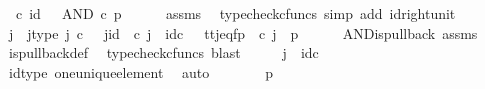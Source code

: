 \begin{isabellebody}
\ {\isachardoublequoteopen}{\isasymt}\ {\isasymcirc}\isactrlsub c\ id\ {\isasymone}\ {\isacharequal}{\kern0pt}\ AND\ {\isasymcirc}\isactrlsub c\ {\isasymlangle}p{\isacharcomma}{\kern0pt}{\isasymf}{\isasymrangle}{\isachardoublequoteclose}\isanewline
\ \ \ \ \isamarkupfalse%
\ assms\ \isamarkupfalse%
\ {\isacharparenleft}{\kern0pt}typecheck{\isacharunderscore}{\kern0pt}cfuncs{\isacharcomma}{\kern0pt}\ simp\ add{\isacharcolon}{\kern0pt}\ id{\isacharunderscore}{\kern0pt}right{\isacharunderscore}{\kern0pt}unit{}{\isacharparenright}{\kern0pt}\isanewline
\ \ \isamarkupfalse%
\ \isamarkupfalse%
\ j\ \ j{\isacharunderscore}{\kern0pt}type{\isacharcolon}{\kern0pt}\ {\isachardoublequoteopen}j\ {\isasymin}\isactrlsub c\ {\isasymone}{\isachardoublequoteclose}\ \ j{\isacharunderscore}{\kern0pt}id{\isacharcolon}{\kern0pt}\ {\isachardoublequoteopen}{\isasymbeta}\isactrlbsub {\isasymone}\isactrlesub \ {\isasymcirc}\isactrlsub c\ j\ {\isacharequal}{\kern0pt}\ id\isactrlsub c\ {\isasymone}{\isachardoublequoteclose}\ \ tt{\isacharunderscore}{\kern0pt}j{\isacharunderscore}{\kern0pt}eq{\isacharunderscore}{\kern0pt}fp{\isacharcolon}{\kern0pt}\ {\isachardoublequoteopen}{\isasymlangle}{\isasymt}{\isacharcomma}{\kern0pt}{\isasymt}{\isasymrangle}\ {\isasymcirc}\isactrlsub c\ j\ {\isacharequal}{\kern0pt}\ {\isasymlangle}p{\isacharcomma}{\kern0pt}{\isasymf}{\isasymrangle}{\isachardoublequoteclose}\isanewline
\ \ \ \ \isamarkupfalse%
\ AND{\isacharunderscore}{\kern0pt}is{\isacharunderscore}{\kern0pt}pullback\ assms\ \isamarkupfalse%
\ is{\isacharunderscore}{\kern0pt}pullback{\isacharunderscore}{\kern0pt}def\ \isamarkupfalse%
\ {\isacharparenleft}{\kern0pt}typecheck{\isacharunderscore}{\kern0pt}cfuncs{\isacharcomma}{\kern0pt}\ blast{\isacharparenright}{\kern0pt}\isanewline
\ \ \isamarkupfalse%
\ \isamarkupfalse%
\ {\isachardoublequoteopen}j\ {\isacharequal}{\kern0pt}\ id\isactrlsub c\ {\isasymone}{\isachardoublequoteclose}\isanewline
\ \ \ \ \isamarkupfalse%
\ id{\isacharunderscore}{\kern0pt}type\ one{\isacharunderscore}{\kern0pt}unique{\isacharunderscore}{\kern0pt}element\ \isamarkupfalse%
\ auto\isanewline
\ \ \isamarkupfalse%
\ \isamarkupfalse%
\ {\isachardoublequoteopen}{\isasymlangle}{\isasymt}{\isacharcomma}{\kern0pt}{\isasymt}{\isasymrangle}\ {\isacharequal}{\kern0pt}\ {\isasymlangle}p{\isacharcomma}{\kern0pt}{\isasymf}{\isasymrangle}{\isachardoublequoteclose}\isanewline

\end{isabellebody}
